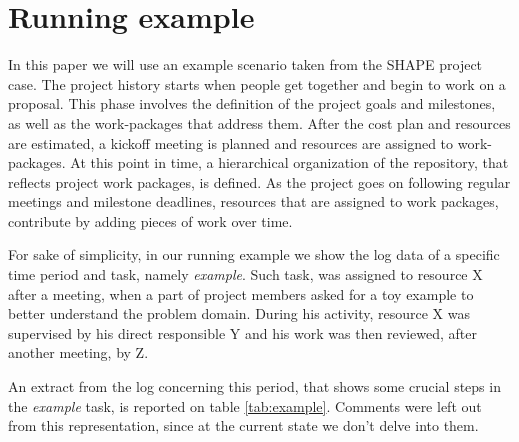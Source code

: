 \section{Running example}\label{sec:running_example}

In this paper we will use an example scenario taken from the SHAPE project case. The project history starts when people get together and begin to work on a proposal. This phase involves the definition of the project goals and milestones, as well as the work-packages that address them. After the cost plan and resources are estimated, a kickoff meeting is planned and resources are assigned to work-packages. At this point in time, a hierarchical organization of the repository, that reflects project work packages, is defined. As the project goes on following regular meetings and milestone deadlines, resources that are assigned to work packages, contribute by adding pieces of work over time. 

For sake of simplicity, in our running example we show the log data of a specific time period and task, namely \emph{example}. Such task, was assigned to resource X after a meeting, when a part of project members asked for a toy example to better understand the problem domain. During his activity, resource X was supervised by his direct responsible Y and his work was then reviewed, after another meeting, by Z. 

An extract from the log concerning this period, that shows some crucial steps in the \emph{example} task, is reported on table \ref{tab:example}. Comments were left out from this representation, since at the current state we don't delve into them.   

